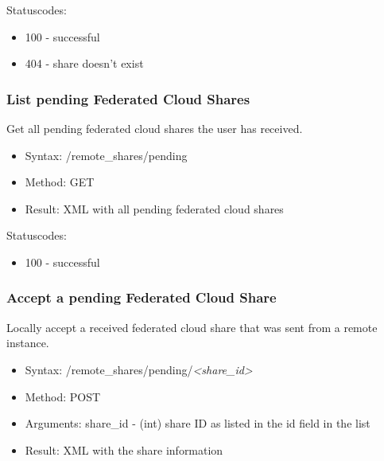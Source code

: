 \documentclass[letterpaper,10pt,english]{sphinxmanual}
\begin{document}
Statuscodes:
\begin{itemize}
\item {} 
100 - successful

\item {} 
404 - share doesn't exist

\end{itemize}


\subsubsection{List pending Federated Cloud Shares}
\label{core/ocs-share-api:list-pending-federated-cloud-shares}
Get all pending federated cloud shares the user has received.
\begin{itemize}
\item {} 
Syntax: /remote\_shares/pending

\item {} 
Method: GET

\item {} 
Result: XML with all pending federated cloud shares

\end{itemize}

Statuscodes:
\begin{itemize}
\item {} 
100 - successful

\end{itemize}


\subsubsection{Accept a pending Federated Cloud Share}
\label{core/ocs-share-api:accept-a-pending-federated-cloud-share}
Locally accept a received federated cloud share that was sent from a remote instance.
\begin{itemize}
\item {} 
Syntax: /remote\_shares/pending/\emph{\textless{}share\_id\textgreater{}}

\item {} 
Method: POST

\item {} 
Arguments: share\_id - (int) share ID as listed in the id field in the  list

\item {} 
Result: XML with the share information

\end{itemize}
\end{document}
